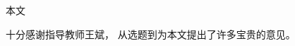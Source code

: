 \vspace{2cm}
\begin{center}
      \textbf{}
\end{center}
\vspace{2cm}
\par 本文
\par 十分感谢指导教师王斌，
从选题到为本文提出了许多宝贵的意见。